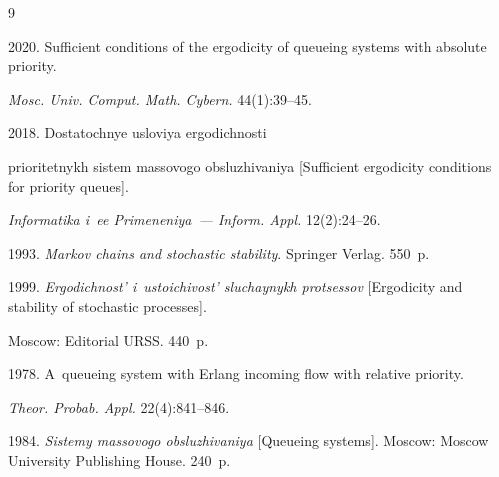 \renewcommand{\bibname}{\protect\rmfamily References}




{\small\frenchspacing

{%


\begin{thebibliography}{9}



 2020. Sufficient conditions of the ergodicity of queueing systems with absolute priority. 

\textit{Mosc. Univ. Comput. Math. Cybern.} 44(1):39--45.




 2018. Dostatochnye usloviya ergodichnosti

prioritetnykh sistem massovogo obsluzhivaniya [Sufficient ergodicity conditions for priority queues]. 

\textit{Informatika i~ee Primeneniya~--- Inform. Appl.} 12(2):24--26.




 1993. \textit{Markov chains and stochastic stability}. Springer Verlag. 550~p.




 1999. \textit{Ergodichnost' i~ustoichivost' sluchaynykh protsessov} [Ergodicity and stability of stochastic processes].

 Moscow: Editorial URSS. 440~p.




 1978. A~queueing system with Erlang incoming flow with relative priority. 

\textit{Theor. Probab. Appl.} 22(4):841--846.





 1984. \textit{Sistemy massovogo obsluzhivaniya} [Queueing systems]. Moscow: Moscow University Publishing House. 240~p.

 \end{thebibliography}

} }



